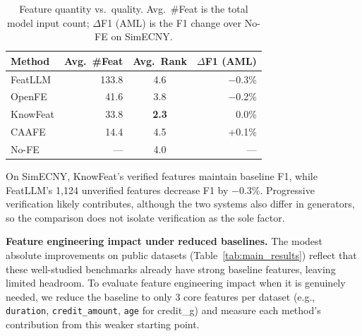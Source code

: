 \begin{table}[t]
\centering
\caption{Feature quantity vs.\ quality. Avg.\ \#Feat is the total model input count; $\Delta$F1 (AML) is the F1 change over No-FE on SimECNY.}
\label{tab:quantity_quality}
\small
\renewcommand{\arraystretch}{1.2}
\setlength{\tabcolsep}{4pt}
\begin{tabular}{l r c r}
\hline
\textbf{Method} & \textbf{Avg.\ \#Feat} & \textbf{Avg.\ Rank} & \textbf{$\Delta$F1 (AML)} \\
\hline
FeatLLM   & 133.8 & 4.6 & $-$0.3\% \\
OpenFE    & 41.6  & 3.8 & $-$0.2\% \\
KnowFeat  & 33.8  & \textbf{2.3} & 0.0\% \\
CAAFE     & 14.4  & 4.5 & +0.1\% \\
No-FE     & ---   & 4.0 & --- \\
\hline
\end{tabular}
\end{table}

On SimECNY, KnowFeat's verified features maintain baseline F1, while FeatLLM's 1{,}124 unverified features decrease F1 by $-$0.3\%. Progressive verification likely contributes, although the two systems also differ in generators, so the comparison does not isolate verification as the sole factor.

\textbf{Feature engineering impact under reduced baselines.}
The modest absolute improvements on public datasets (Table~\ref{tab:main_results}) reflect that these well-studied benchmarks already have strong baseline features, leaving limited headroom. To evaluate feature engineering impact when it is genuinely needed, we reduce the baseline to only 3 core features per dataset (e.g., \texttt{duration}, \texttt{credit\_amount}, \texttt{age} for credit\_g) and measure each method's contribution from this weaker starting point.

\begin{table}[t]
\centering
\caption{AUC with a reduced baseline (3 core features only). Identifier and label columns are excluded from every method.}
\label{tab:reduced_baseline}
\footnotesize
\renewcommand{\arraystretch}{1.2}
\end{table}

